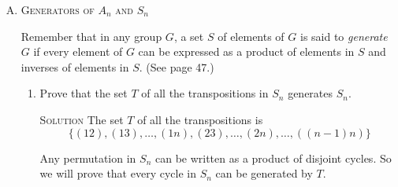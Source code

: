\documentclass[twoside]{amsart}
\newcommand{\solution}{\textsc{Solution}\xspace}
\begin{document}
\begin{enumerate}[A.]
\begin{enumerate}[1]
       \item The set of all even permutations is a subgroup of $S_n$.
       (It is denoted by $A_n$ and is called the \emph{alternating group}
       on $n$ symbols.)

       \noindent \solution We must show that the subgroup $A_n$ is closed
       with respect to $\circ$ and with respect to function inverses.
       We know from C2 that the product of two even permutations is even,
       so $A_n$ is closed with respect to $\circ$. Next we use some logic
       from p85. If a permuation, $\pi$, is even then it's inverse,
       $\pi^{-1}$ must be even as well. For if it were odd, then if
       we mulitply them we would get an odd permutation (by C2) for 
       $\epsilon$. Therefore $\pi^{-1}$ must be even and therefore
       $A_n$ is closed with respect to function inverses. Therefore,
       $A_n$ is a subgroup of $S_n$.

       \item Let $H$ be any subgroup of $S_n$. $H$ either contains only
       even permutations, or $H$ contains the same number of odd as even
       permutations. (Use parts 1 and 2.)

       \noindent \solution So we know it's possible from part 4 for a subgroup
       to have only even permutations. So this proof boils down to the fact
       that if there is at least one odd permutation then there must
       be an equal number of even and odd permutations. The proof follows the
       same as \#3 except the distinct permutations used are on the
       subgroup not on the group.

   \end{enumerate}

   \item \textsc{Generators of $A_n$ and $S_n$}

   Remember that in any group $G$, a set $S$ of elements of $G$ is
   said to \emph{generate} $G$ if every element of $G$ can
   be expressed as a product of elements in $S$ and inverses of elements
   in $S$. (See page 47.)

   \begin{enumerate}[1]
      \item Prove that the set $T$ of all the transpositions in $S_n$
      generates $S_n$.

      \noindent \solution The set $T$ of all the transpositions is 
      \[\{(12),(13),\ldots,(1n),(23),\ldots,(2n),\ldots,((n-1)n)\}\]

      Any permutation in $S_n$ can be written as a product of disjoint
      cycles. So we will prove that every cycle in $S_n$ can be generated by
      $T$.


\end{enumerate}
\end{enumerate}
\end{document}

